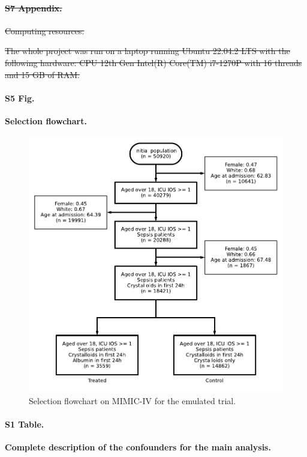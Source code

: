 \documentclass[10pt,letterpaper]{article}
\providecommand{\DIFdeltex}[1]{{\protect\color{red}\sout{#1}}}                      %
\providecommand{\DIFdelbegin}{} %
\providecommand{\DIFdelend}{} %
\providecommand{\DIFdel}[1]{\texorpdfstring{\DIFdeltex{#1}}{}} %
\newcommand{\DIFscaledelfig}{0.5}
\newlength{\DIFdelgraphicswidth} %
\newlength{\DIFdelgraphicsheight} %
\newcommand{\DIFdelincludegraphics}[2][]{%
\sbox{\DIFdelgraphicsbox}{\DIFOincludegraphics[#1]{#2}}%
\settoboxwidth{\DIFdelgraphicswidth}{\DIFdelgraphicsbox} %
\settoboxtotalheight{\DIFdelgraphicsheight}{\DIFdelgraphicsbox} %
\scalebox{\DIFscaledelfig}{%
\parbox[b]{\DIFdelgraphicswidth}{\usebox{\DIFdelgraphicsbox}\\[-\baselineskip] \rule{\DIFdelgraphicswidth}{0em}}\llap{\resizebox{\DIFdelgraphicswidth}{\DIFdelgraphicsheight}{%
\setlength{\unitlength}{\DIFdelgraphicswidth}%
\begin{picture}(1,1)%
\thicklines\linethickness{2pt} %
{\color[rgb]{1,0,0}\put(0,0){\framebox(1,1){}}}%
{\color[rgb]{1,0,0}\put(0,0){\line( 1,1){1}}}%
{\color[rgb]{1,0,0}\put(0,1){\line(1,-1){1}}}%
\end{picture}%
}\hspace*{3pt}}} %
} %
\DeclareRobustCommand{\DIFdelbegin}{\DIFOdelbegin \let\includegraphics\DIFdelincludegraphics} %
\DeclareRobustCommand{\DIFdelend}{\DIFOaddend \let\includegraphics\DIFOincludegraphics} %
\begin{document}
\DIFdelbegin \paragraph*{\DIFdel{S7 Appendix.}}
\DIFdel{Computing resources.}%

\DIFdel{The whole project was run on a laptop running Ubuntu 22.04.2 LTS with the following hardware:
  CPU 12th Gen Intel(R) Core(TM) i7-1270P with 16 threads and 15 GB of RAM.
}%

\DIFdelend \paragraph*{S5 Fig.}
\label{apd:selection_flowchart}
{\bf Selection flowchart.}

\begin{figure}[!htb]
  \centering
  \includegraphics[width=0.7\linewidth]{img_supp/albumin_for_sepsis__obs_1d__flowchart_albumin_for_sepsis.pdf}
  \caption{Selection flowchart on MIMIC-IV for the emulated trial.}\label{fig:selection_flowchart}
\end{figure}
\clearpage


\paragraph*{S1 Table.}
\label{apd:albumin_for_sepsis:table1_complete}
{\bf Complete description of the confounders for the main analysis.}
\begin{table}[h!]
  \resizebox{\textwidth}{!}{%
    
  }\\
  \caption{Characteristics of the trial population measured on the first 24
    hours of ICU stay. \\
    Risk scores (AKI, SOFA, SAPSII) and lactates have been summarized as the
    maximum value during the 24 hour period for each stay. Total cumulative urine output has
    been computed. Other variables have been aggregated by taking mean during
    the 24 hour period.}\label{apd:table:albumin_for_sepsis:table1_complete}
\end{table}
\clearpage
\end{document}
